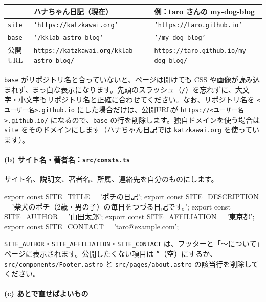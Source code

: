\documentclass[a4paper,11pt]{ltjsarticle}
\newcommand{\file}[1]{\texttt{#1}}
\begin{document}
\begin{center}
\small
\begin{tabular}{@{}lll@{}}
\toprule
 & ハナちゃん日記（現在） & 例：taro さんの my-dog-blog \\
\midrule
\file{site} & \file{'https://katzkawai.org'} & \file{'https://taro.github.io'} \\
\file{base} & \file{'/kklab-astro-blog'} & \file{'/my-dog-blog'} \\
公開URL & \file{https://katzkawai.org/kklab-astro-blog/} & \file{https://taro.github.io/my-dog-blog/} \\
\bottomrule
\end{tabular}
\end{center}

\begin{hint}[ここを間違えると表示がくずれる]
\file{base} がリポジトリ名と合っていないと、ページは開けても CSS や画像が読み込まれず、まっ白な表示になります。先頭のスラッシュ（\file{/}）を忘れずに、大文字・小文字もリポジトリ名と正確に合わせてください。なお、リポジトリ名を \file{<ユーザー名>.github.io} にした場合だけは、公開URLが \file{https://<ユーザー名>.github.io/} になるので、\file{base} の行を削除します。独自ドメインを使う場合は \file{site} をそのドメインにします（ハナちゃん日記では \file{katzkawai.org} を使っています）。
\end{hint}

\paragraph{(b) サイト名・著者名：\file{src/consts.ts}}

サイト名、説明文、著者名、所属、連絡先を自分のものにします。

\begin{code}
export const SITE_TITLE = 'ポチの日記';
export const SITE_DESCRIPTION = '柴犬のポチ（2歳・男の子）の毎日をつづる日記です。';
export const SITE_AUTHOR = '山田太郎';
export const SITE_AFFILIATION = '東京都';
export const SITE_CONTACT = 'taro@example.com';
\end{code}

\file{SITE\_AUTHOR}・\file{SITE\_AFFILIATION}・\file{SITE\_CONTACT} は、フッターと「〜について」ページに表示されます。公開したくない項目は \file{''}（空）にするか、\file{src/components/Footer.astro} と \file{src/pages/about.astro} の該当行を削除してください。

\paragraph{(c) あとで直せばよいもの}
\end{document}
